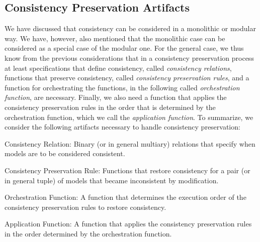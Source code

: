 \subsection{Consistency Preservation Artifacts}

We have discussed that consistency can be considered in a monolithic or modular way. We have, however, also mentioned that the monolithic case can be considered as a special case of the modular one.
For the general case, we thus know from the previous considerations that in a consistency preservation process at least specifications that define consistency, called \emph{consistency relations}, functions that preserve consistency, called \emph{consistency preservation rules}, and a function for orchestrating the functions, in the following called \emph{orchestration function}, are necessary. Finally, we also need a function that applies the consistency preservation rules in the order that is determined by the orchestration function, which we call the \emph{application function}.
To summarize, we consider the following artifacts necessary to handle consistency preservation:
\begin{properdescription}
    \item[Consistency Relation:] Binary (or in general multiary) relations that specify when models are to be considered consistent.
    \item[Consistency Preservation Rule:] Functions that restore consistency for a pair (or in general tuple) of models that became inconsistent by modification.
    \item[Orchestration Function:] A function that determines the execution order of the consistency preservation rules to restore consistency.
    \item[Application Function:] A function that applies the consistency preservation rules in the order determined by the orchestration function. 
\end{properdescription}

